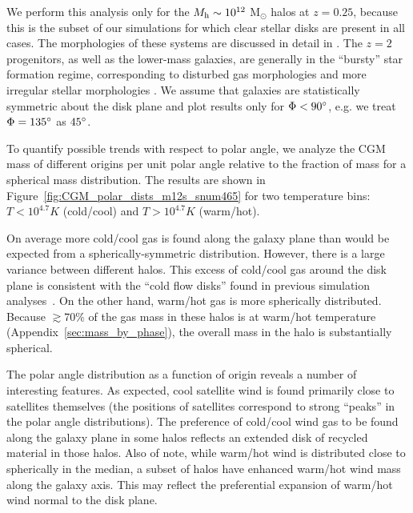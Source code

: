 \documentclass[fleqn,usenatbib]{mnras}
\begin{document}
We perform this analysis only for the $M_{\rm h} \sim 10^{12}$ M$_\odot$ halos at $z=0.25$, because this is the subset of our simulations for which clear stellar disks are present in all cases. 
The morphologies of these systems are discussed in detail in \cite{Garrison-kimmel2017}. 
The $z=2$ progenitors, as well as the lower-mass galaxies,  are generally in the ``bursty'' star formation regime, corresponding to disturbed gas morphologies and more irregular stellar morphologies \citep[e.g.,][]{Hopkins2014,El-Badry2015,Sparre2017,Faucher-Giguere2017,El-Badry2018}.
We assume that galaxies are statistically symmetric about the disk plane and plot results only for $\Phi < 90\hbox{$^\circ$}$, e.g. we treat $\Phi = 135\hbox{$^\circ$}$ as $45\hbox{$^\circ$}$.

To quantify possible trends with respect to polar angle, we analyze the CGM mass of different origins per unit polar angle relative to the fraction of mass for a spherical mass distribution.
The results are shown in Figure~\ref{fig:CGM_polar_dists_m12s_snum465} for two temperature bins: $T<10^{4.7} K$ (cold/cool) and $T>10^{4.7} K$ (warm/hot).

On average more cold/cool gas is found along the galaxy plane than would be expected from a spherically-symmetric distribution. However, there is a large variance between different halos.
This excess of cold/cool gas around the disk plane is consistent with the ``cold flow disks'' found in previous simulation analyses~\citep[e.g.][]{Keres2009b,2013ApJ...769...74S, Stewart2016}.
On the other hand, warm/hot gas is more spherically distributed. 
Because $\gtrsim 70\%$ of the gas mass in these halos is at warm/hot temperature (Appendix~\ref{sec:mass_by_phase}), the overall mass in the halo is substantially spherical.

The polar angle distribution as a function of origin reveals a number of interesting features.
As expected, cool satellite wind is found primarily close to satellites themselves (the positions of satellites correspond to strong ``peaks'' in the polar angle distributions). 
The preference of cold/cool wind gas to be found along the galaxy plane in some halos reflects an extended disk of recycled material in those halos.
Also of note, while warm/hot wind is distributed close to spherically in the median, a subset of halos have enhanced warm/hot wind mass along the galaxy axis. 
This may reflect the preferential expansion of warm/hot wind normal to the disk plane.
\end{document}
